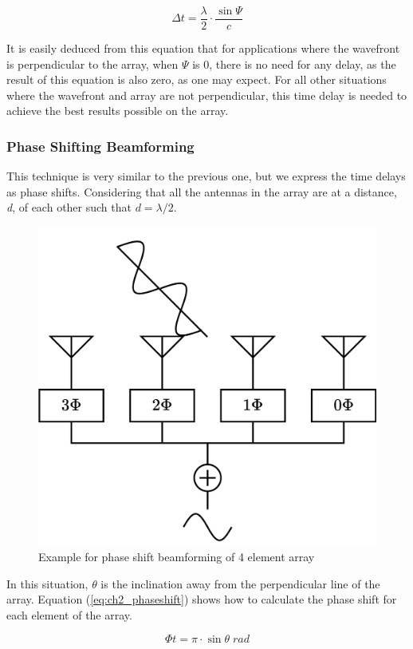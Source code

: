\begin{equation}
    \label{eq:ch2_timedelay}
    \Delta t = \frac{\lambda}{2}\cdot\frac{\sin{\Psi}}{c}
\end{equation}

\par It is easily deduced from this equation that for applications where the wavefront is perpendicular to the array, when $\Psi$ is 0, there is no need for any delay, as the result of this equation is also zero, as one may expect. For all other situations where the wavefront and array are not perpendicular, this time delay is needed to achieve the best results possible on the array.

\subsubsection{Phase Shifting Beamforming}
\par This technique is very similar to the previous one, but we express the time delays as phase shifts. Considering that all the antennas in the array are at a distance, \textit{d}, of each other such that $d=\lambda/2$.

\begin{figure}[H]
    \vspace*{0cm}
    \centering
    \includegraphics[width=0.5\linewidth]{figs/ch_2_secArray_Array_Phase_Shift.png}
    \caption{Example for phase shift beamforming of 4 element array}
    \label{fig:ch_2_secArray_Array_Phase_Shift}
\end{figure}

\par In this situation, $\theta$ is the inclination away from the perpendicular line of the array. Equation (\ref{eq:ch2_phaseshift}) shows how to calculate the phase shift for each element of the array.

\begin{equation}
    \label{eq:ch2_phaseshift}
    \Phi t = \pi\cdot\sin{\theta}\; rad
\end{equation}

